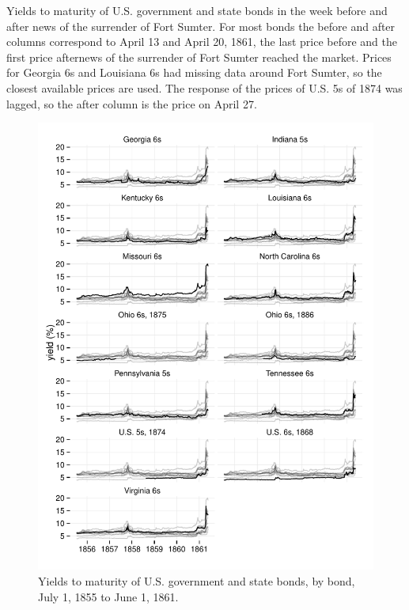 \documentclass[11pt, oneside, article]{memoir}\usepackage[]{graphicx}\usepackage[]{color}
\begin{document}
\begin{table}
  \centerfloat
  

\caption{Yields to maturity of U.S. government and state bonds in the week before and after news of the surrender of Fort Sumter.
  For most bonds the before and after columns correspond to April 13 and April 20, 1861, the last price before and the first price afternews of the surrender of Fort Sumter reached the market.
  Prices for Georgia 6s and Louisiana 6s had missing data around Fort Sumter, so the closest available prices are used.
  The response of the prices of U.S. 5s of 1874 was lagged, so the after column is the price on April 27.}
\label{tab:sumter}

\end{table}

\begin{figure}
  \centerfloat
  \includegraphics{figures/fig_yields_all-1}
\caption{Yields to maturity of U.S. government and state bonds, by bond, July  1, 1855 to June  1, 1861.}
\label{fig:yields_all}
\end{figure}
\end{document}
